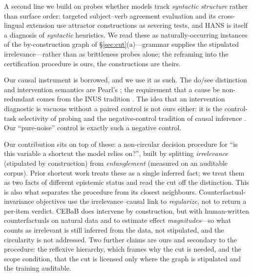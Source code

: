 A second line we build on probes whether models track \emph{syntactic
structure} rather than surface order: targeted subject--verb agreement
evaluation \citep{linzen2016assessing,gulordava2018colorless,marvin2018targeted}
and its cross-lingual extension \citep{mueller2020crosslinguistic} use attractor
constructions as severing tests, and HANS \citep{mccoy2019right} is itself a
diagnosis of \emph{syntactic} heuristics. We read these as naturally-occurring
instances of the by-construction graph of \S\ref{sec:cut}(a)---grammar supplies
the stipulated irrelevance---rather than as brittleness probes alone; the
reframing into the certification procedure is ours, the constructions are theirs.

Our causal instrument is borrowed, and we use it as such. The do/see distinction
and intervention semantics are Pearl's \citep{pearl2009causality,pearl2018book};
the requirement that a cause be non-redundant comes from the INUS tradition
\citep{mackie1965causes,halpern2005causes}. The idea that an intervention
diagnostic is vacuous without a paired control is not ours either: it is the
control-task selectivity of probing \citep{hewitt2019control} and the
negative-control tradition of causal inference
\citep{lipsitch2010negative}. Our ``pure-noise'' control is exactly such a
negative control.

Our contribution sits on top of these: a non-circular decision procedure
for ``is this variable a shortcut the model relies on?'', built by splitting
\emph{irrelevance} (stipulated by construction) from \emph{entanglement}
(measured on an auditable corpus). Prior shortcut work treats these as a
single inferred fact; we treat them as two facts of different epistemic
status and read the cut off the distinction. This is also what separates
the procedure from its closest neighbours.
Counterfactual-invariance objectives \citep{veitch2021counterfactual,
eisenstein2022informativeness} use the irrelevance--causal link to
\emph{regularize}, not to return a per-item verdict. CEBaB
\citep{abraham2022cebab} does intervene by construction, but with human-written
counterfactuals on natural data and to estimate effect \emph{magnitudes}---so
what counts as irrelevant is still inferred from the data, not stipulated, and
the circularity is not addressed. Two further claims are ours and secondary to
the procedure: the reflexive hierarchy, which frames why the cut is needed, and
the scope condition, that the cut is licensed only where the graph is stipulated
and the training auditable.

